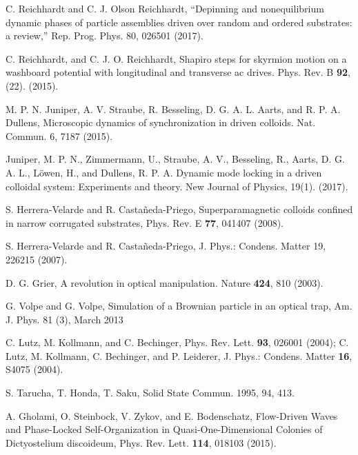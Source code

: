 \documentclass[twocolumn,preprintnumbers,amsmath,amssymb,aps,prx]{revtex4}
\begin{document}
\begin{thebibliography}{99}
     C. Reichhardt and C. J. Olson Reichhardt, “Depinning and nonequilibrium dynamic phases of particle assemblies driven over random and ordered substrates: a review,” Rep. Prog. Phys. 80, 026501 (2017).

     C. Reichhardt, and C. J. O. Reichhardt,  Shapiro steps for skyrmion motion on a washboard potential with longitudinal and transverse ac drives. Phys. Rev. B {\bf 92}, (22). (2015).
      
     M. P. N. Juniper, A. V. Straube, R. Besseling, D. G. A. L. Aarts, and R. P. A. Dullens, Microscopic dynamics of synchronization in driven colloids. Nat. Commun. 6, 7187 (2015).

     Juniper, M. P. N., Zimmermann, U., Straube, A. V., Besseling, R., Aarts, D. G. A. L., Löwen, H., and Dullens, R. P. A.  Dynamic mode locking in a driven colloidal system: Experiments and theory. New Journal of Physics, 19(1). (2017).  %
      
     S. Herrera-Velarde and R. Castañeda-Priego, Superparamagnetic colloids confined in narrow corrugated substrates, Phys. Rev. E {\bf 77}, 041407 (2008).

     S. Herrera-Velarde and R. Castañeda-Priego, J. Phys.: Condens. Matter 19, 226215 (2007).

       D. G. Grier, A revolution in optical manipulation. Nature {\bf 424}, 810 (2003).

       G. Volpe and G. Volpe, Simulation of a Brownian particle in an optical trap, Am. J. Phys. 81 (3), March 2013
        
     C. Lutz, M. Kollmann, and C. Bechinger, Phys. Rev. Lett. {\bf 93}, 026001 (2004); C. Lutz, M. Kollmann, C. Bechinger, and P. Leiderer, J. Phys.: Condens. Matter {\bf 16}, S4075 (2004).

      S. Tarucha, T. Honda,  T. Saku, Solid State Commun. 1995, 94, 413.

     A. Gholami, O. Steinbock, V. Zykov, and E. Bodenschatz, Flow-Driven Waves and Phase-Locked Self-Organization in Quasi-One-Dimensional Colonies of Dictyostelium discoideum, Phys. Rev. Lett. {\bf 114}, 018103 (2015).


\end{thebibliography}
\end{document}
